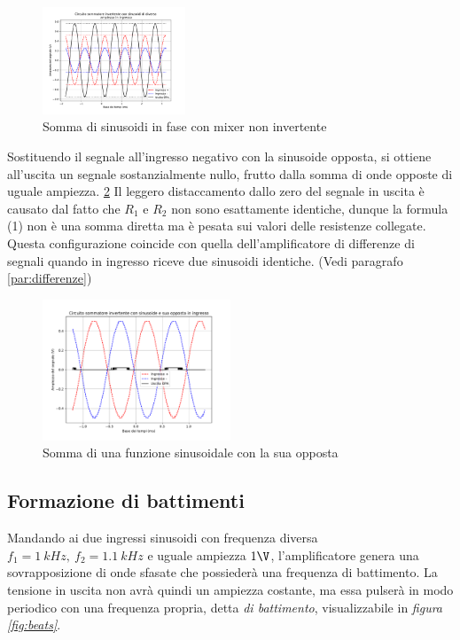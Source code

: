 \documentclass[journal]{IEEEtran}
\begin{document}
\begin{figure}[H]%
\begin {center}
\includegraphics[width=0.38\textwidth]{analysis/output/OPA_mixer_sin3.pdf}
\caption{Somma di sinusoidi in fase con mixer non invertente}
\label{fig:Mixer3}
\end {center}
\end{figure}

Sostituendo il segnale all'ingresso negativo con la sinusoide opposta, si ottiene all'uscita un segnale sostanzialmente nullo, frutto dalla somma di onde opposte di uguale ampiezza. \ref{fig:Mixer2} Il leggero distaccamento dallo zero del segnale in uscita è causato dal fatto che $R_1$ e $R_2$ non sono esattamente identiche, dunque la formula (1) non è una somma diretta ma è pesata sui valori delle resistenze collegate. Questa configurazione coincide con quella dell'amplificatore di differenze di segnali quando in ingresso riceve due sinusoidi identiche. (Vedi paragrafo \ref{par:differenze})

\begin{figure}[H]%
\begin {center}
\includegraphics[width=0.50\textwidth]{analysis/output/OPA_mixer_sin2.pdf}
\caption{Somma di una funzione sinusoidale con la sua opposta}
\label{fig:Mixer2}
\end {center}
\end{figure}

\subsection{Formazione di battimenti}
Mandando ai due ingressi sinusoidi con frequenza diversa $f_1 = 1\ kHz, \ f_2 = 1.1\ kHz$ e uguale ampiezza $1 \V$, l'amplificatore genera una sovrapposizione di onde sfasate che possiederà una frequenza di battimento. La tensione in uscita non avrà quindi un ampiezza costante, ma essa pulserà in modo periodico con una frequenza propria, detta \textit{di battimento}, visualizzabile in \textit{figura \ref{fig:beats}}.
\end{document}
